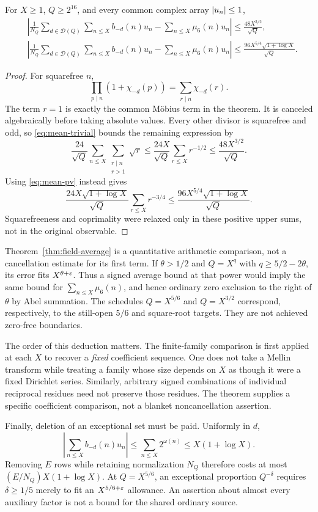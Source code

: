 \begin{theorem}\label{thm:field-average}
For $X\ge1$, $Q\ge2^{16}$, and every common complex array $\lvert u_n\rvert\le1$,
\begin{align}
 &\left|\frac1{N_Q}\sum_{d\in\mathcal D(Q)}
       \sum_{n\le X}b_{-d}(n)u_n
       -\sum_{n\le X}\mu_6(n)u_n\right|
 \le\frac{48X^{3/2}}{\sqrt Q},\label{eq:field-average-weak}\\
 &\left|\frac1{N_Q}\sum_{d\in\mathcal D(Q)}
       \sum_{n\le X}b_{-d}(n)u_n
       -\sum_{n\le X}\mu_6(n)u_n\right|
 \le\frac{96X^{5/4}\sqrt{1+\log X}}{\sqrt Q}.
 \label{eq:field-average}
\end{align}
\end{theorem}
\begin{proof}
For squarefree $n$,
\[
 \prod_{p\mid n}(1+\chi_{-d}(p))=\sum_{r\mid n}\chi_{-d}(r).
\]
The term $r=1$ is exactly the common M\"obius term in the theorem. It is canceled algebraically before taking absolute values. Every other divisor is squarefree and odd, so \eqref{eq:mean-trivial} bounds the remaining expression by
\[
 \frac{24}{\sqrt Q}\sum_{n\le X}\sum_{\substack{r\mid n\\r>1}}\sqrt r
 \le\frac{24X}{\sqrt Q}\sum_{r\le X}r^{-1/2}
 \le\frac{48X^{3/2}}{\sqrt Q}.
\]
Using \eqref{eq:mean-pv} instead gives
\[
 \frac{24X\sqrt{1+\log X}}{\sqrt Q}\sum_{r\le X}r^{-3/4}
 \le\frac{96X^{5/4}\sqrt{1+\log X}}{\sqrt Q}.
\]
Squarefreeness and coprimality were relaxed only in these positive upper sums, not in the original observable.
\end{proof}

Theorem~\ref{thm:field-average} is a quantitative arithmetic comparison, not a cancellation estimate for its first term. If $\theta>1/2$ and $Q=X^q$ with $q\ge5/2-2\theta$, its error fits $X^{\theta+\varepsilon}$. Thus a signed average bound at that power would imply the same bound for $\sum_{n\le X}\mu_6(n)$, and hence ordinary zero exclusion to the right of $\theta$ by Abel summation. The schedules $Q=X^{5/6}$ and $Q=X^{3/2}$ correspond, respectively, to the still-open $5/6$ and square-root targets. They are not achieved zero-free boundaries.

The order of this deduction matters. The finite-family comparison is first applied at each $X$ to recover a \emph{fixed} coefficient sequence. One does not take a Mellin transform while treating a family whose size depends on $X$ as though it were a fixed Dirichlet series. Similarly, arbitrary signed combinations of individual reciprocal residues need not preserve those residues. The theorem supplies a specific coefficient comparison, not a blanket noncancellation assertion.

Finally, deletion of an exceptional set must be paid. Uniformly in $d$,
\[
 \left|\sum_{n\le X}b_{-d}(n)u_n\right|
 \le\sum_{n\le X}2^{\omega(n)}\le X(1+\log X).
\]
Removing $E$ rows while retaining normalization $N_Q$ therefore costs at most $(E/N_Q)X(1+\log X)$. At $Q=X^{5/6}$, an exceptional proportion $Q^{-\delta}$ requires $\delta\ge1/5$ merely to fit an $X^{5/6+\varepsilon}$ allowance. An assertion about almost every auxiliary factor is not a bound for the shared ordinary source.
